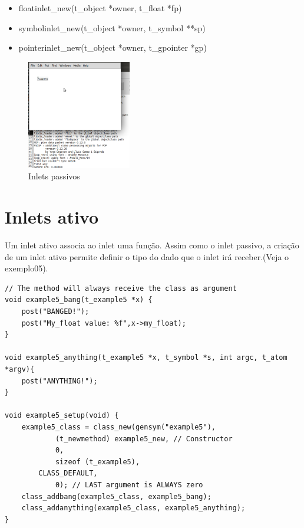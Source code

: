 \documentclass[10pt,a4paper]{report}
\begin{document}
\begin{itemize}
\item floatinlet\_new(t\_object *owner, t\_float *fp)
\item symbolinlet\_new(t\_object *owner, t\_symbol **sp)
\item pointerinlet\_new(t\_object *owner, t\_gpointer *gp)
\end{itemize}

\begin{figure}[h!]
	\centering
	\includegraphics[height=180]{./images/example4}
	\caption{Inlets passivos}
\end{figure}

\section{Inlets ativo}
Um inlet ativo associa ao inlet uma função. Assim como o inlet passivo, a criação de um inlet ativo permite definir o tipo do dado que o inlet irá receber.(Veja o exemplo05).

\begin{lstlisting}
// The method will always receive the class as argument
void example5_bang(t_example5 *x) { 
    post("BANGED!");
    post("My_float value: %f",x->my_float);
}

void example5_anything(t_example5 *x, t_symbol *s, int argc, t_atom *argv){
	post("ANYTHING!");
}

void example5_setup(void) {
    example5_class = class_new(gensym("example5"),
            (t_newmethod) example5_new, // Constructor
            0, 
            sizeof (t_example5),
	    CLASS_DEFAULT,
            0); // LAST argument is ALWAYS zero
    class_addbang(example5_class, example5_bang);
    class_addanything(example5_class, example5_anything);
}
\end{lstlisting}
\end{document}
